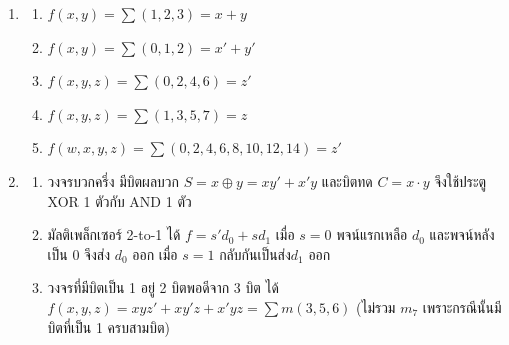 \begin{enumerate}[resume*=anskey]
    \label{sec:kmap-solutions}
    \item
    \begin{enumerate}[label=\textbf{\thechapter.\arabic{enumi}.\arabic*}]
        \item $f(x, y) = \sum(1, 2, 3) = x + y$
        \item $f(x, y) = \sum(0, 1, 2) = x' + y'$
        \item $f(x, y, z) = \sum(0, 2, 4, 6) = z'$
        \item $f(x, y, z) = \sum(1, 3, 5, 7) = z$
        \item $f(w, x, y, z) = \sum(0, 2, 4, 6, 8, 10, 12, 14) = z'$
    \end{enumerate}

    \item
    \begin{enumerate}[label=\textbf{\thechapter.\arabic{enumi}.\arabic*}]
        \item วงจรบวกครึ่ง มีบิตผลบวก $S = x \oplus y = x y' + x' y$ และบิตทด $C = x \cdot y$ จึงใช้ประตู XOR 1 ตัวกับ AND 1 ตัว
        \item มัลติเพล็กเซอร์ 2-to-1 ได้ $f = s' d_0 + s d_1$ เมื่อ $s=0$ พจน์แรกเหลือ $d_0$ และพจน์หลังเป็น 0 จึงส่ง $d_0$ ออก เมื่อ $s=1$ กลับกันเป็นส่ง$d_1$ ออก
        \item วงจรที่มีบิตเป็น 1 อยู่ 2 บิตพอดีจาก 3 บิต ได้ $f(x, y, z) = x y z' + x y' z + x' y z = \sum m(3, 5, 6)$ (ไม่รวม $m_7$ เพราะกรณีนั้นมีบิตที่เป็น 1 ครบสามบิต)
    \end{enumerate}
\end{enumerate}

